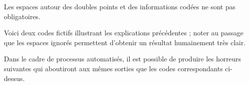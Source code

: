 \documentclass[12pt, a4paper]{article}
\begin{document}






\begin{tdocnote}
    Les espaces autour des doubles points et des informations codées ne sont pas obligatoires.
\end{tdocnote}




Voici deux codes fictifs illustrant les explications précédentes ; noter au passage que les espaces ignorés permettent d'obtenir un résultat humainement très clair.
\begin{multicols}{2}

\end{multicols}

Dans le cadre de processus automatisés, il est possible de produire les horreurs suivantes qui aboutiront aux mêmes sorties que les codes correspondants ci-dessus.
\begin{multicols}{2}

\end{multicols}
\end{document}
